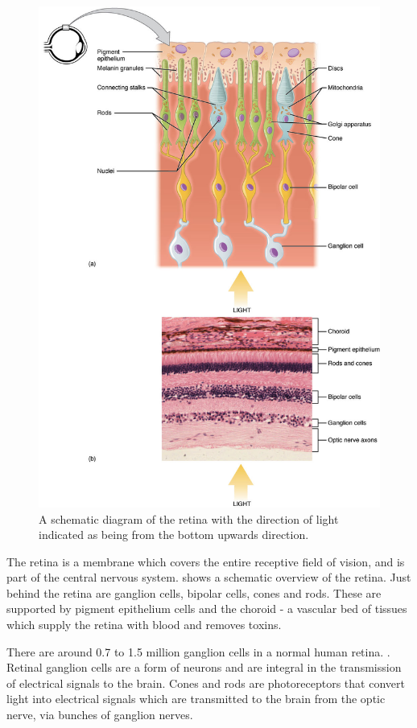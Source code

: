 \begin{figure}[H]
\centering
  \includegraphics{figures/rods_and_cones}
\caption{A schematic diagram of the retina with the direction of light indicated
as being from the bottom upwards direction.}
\label{fig:retina}
\end{figure}

The retina is a membrane which covers the entire receptive field of
vision, and is part of the central nervous system.\cite{rogers1983neurite}
 shows a schematic overview of the retina. Just behind the
retina are ganglion cells, bipolar cells, cones and rods. These are supported
by pigment epithelium cells and the choroid - a vascular bed of tissues which
supply the retina with blood and removes toxins. \cite{lutty1996localization} 

There are around 0.7 to 1.5 million ganglion cells in a normal human retina.
\cite{curcio1990topography}. Retinal ganglion cells are a form of neurons
and are integral in the transmission of electrical signals to the brain.
\cite{meyer1995characterization} Cones and rods are photoreceptors
that convert light into electrical signals which are transmitted to the
brain from the optic nerve, via bunches of ganglion nerves.

